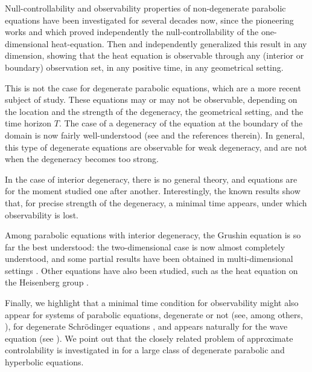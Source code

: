 Null-controllability and observability properties of non-degenerate parabolic equations have been investigated
for several decades now, since the pioneering works \cite{egorov} and \cite{fattorini_russel} which proved independently the null-controllability of the one-dimensional heat-equation. Then \cite{Lebeau_Robbiano}
and \cite{Fursikov_Imanuvilov} independently generalized this result in any dimension, showing
that the heat equation is observable through any (interior or boundary) observation set, in any positive time, in any
geometrical setting.

This is not the case for degenerate parabolic equations, which are a more recent subject of study. These equations
may or may not be observable, depending on the location and the strength of the degeneracy, the geometrical setting, and the time horizon $T$.
The case of a degeneracy of the equation at the boundary of the domain
is now fairly well-understood (see \cite{Cannarsa_Martinez_Vancostenoble} and the references therein). In general, this type of degenerate equations are observable for weak degeneracy, and are not when the degeneracy becomes too strong.

In the case of interior
degeneracy, there is no general theory, and equations are for the moment studied one after another.
Interestingly, the known results show that, for precise strength of the degeneracy, a minimal time
appears, under which observability is lost.

Among parabolic equations with interior degeneracy, the Grushin equation is so far the best understood: the two-dimensional case is now
almost completely understood, and some partial results have been obtained in multi-dimensional settings \cite{Beauchard_Cannarsa_Guglielmi,Beauchard_Miller_Morancey,Koenig17,Lissy19,Beauchard_Darde_Ervedoza,Duprez_Koenig,Allonsius_Boyer_Morancey}. Other equations have also been studied, such as the heat equation on the Heisenberg group \cite{Beauchard_Cannarsa}.

Finally, we highlight that a minimal time condition for observability might also appear for systems of parabolic equations, degenerate or not (see, among others, \cite{AmmarKhodja_Benabdallah_GonzalesBurgos_deTeresa,Duprez,Benabdallah_Boyer_Morancey}),
for degenerate Schrödinger equations \cite{Burq_Sun_19,LetrouitSun20}, and appears naturally for the wave equation (see \cite{raucht74,bardoslr92}). We point out that the closely related problem of approximate controlability
is investigated in \cite{LaurentLeautaud18} for a large class of degenerate parabolic and hyperbolic equations.

